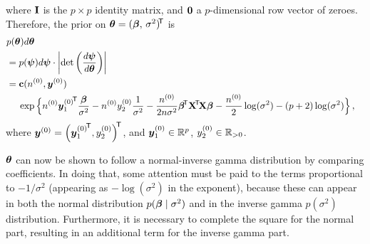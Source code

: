 where $\mathbf{I}$ is the $p \times p$ identity matrix, and $\mathbf{0}$ a $p$-dimensional row vector of zeroes.
Therefore, the prior on $\boldsymbol{\theta} = (\boldsymbol{\beta},\, \sigma^2)^{{\mbox{\!\scriptsize\textsf{T}}}}$ is
\begin{align}
\begin{split}
\lefteqn{p(\btheta) d\btheta} \hspace{0ex}\\
                   &= p(\bpsi) d\bpsi \cdot \left| \mbox{det}\left( \frac{d\bpsi}{d\btheta} \right) \right| \\
                   &= \mbf{c}(\nz, \byz) \\
                   & \hspace*{3ex}        \exp\Big\{ \nz {\byz_1}^\tra \frac{\bbeta}{\sigma^2}
                                                    -\nz  \yz_2 \frac{1}{\sigma^2}
                                                    -\frac{\nz}{2n\sigma^2} \bbeta^\tra \XtX \bbeta
                                                    -\frac{\nz}{2} \log(\sigma^2)
                                                    - (p+2)        \log(\sigma^2) \Big\}\,, %
\end{split}
\label{equ:cccp-ptheta}
\end{align}
where ${\bm y}^{(0)} = \Big({{\bm y}^{(0)}_1}^{{\mbox{\!\scriptsize\textsf{T}}}}, y^{(0)}_2\Big)^{{\mbox{\!\scriptsize\textsf{T}}}}$, and ${\bm y}^{(0)}_1 \in \mathbb{R}^p$, $y^{(0)}_2 \in \mathbb{R}_{>0}$.

$\boldsymbol{\theta}$ can now be shown to follow a normal-inverse gamma distribution by comparing coefficients.
In doing that, some attention must be paid to the terms proportional to $-1/\sigma^2$ (appearing as $-\log(\sigma^2)$ in the exponent),
because these can appear in both the normal distribution $p(\boldsymbol{\beta}\mid\sigma^2)$ and in the inverse gamma $p(\sigma^2)$ distribution.
Furthermore, it is necessary to complete the square for the normal part, resulting in an additional term for the inverse gamma part.

